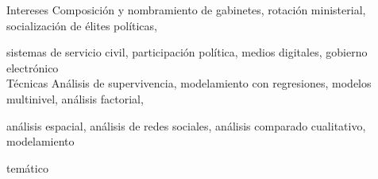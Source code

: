 





\begin{cvskills}

\cvskill
{Intereses}
{Composición y nombramiento de gabinetes, rotación ministerial, socialización de élites políticas,}

\cvskill
{}
{sistemas de servicio civil, participación política, medios digitales, gobierno electrónico}\\

\cvskill
{Técnicas} 
{Análisis de supervivencia, modelamiento con regresiones, modelos multinivel, análisis factorial,}

\cvskill
{} 
{análisis espacial, análisis de redes sociales, análisis comparado cualitativo, modelamiento} 

\cvskill
{} 
{temático} \\

\end{cvskills}
